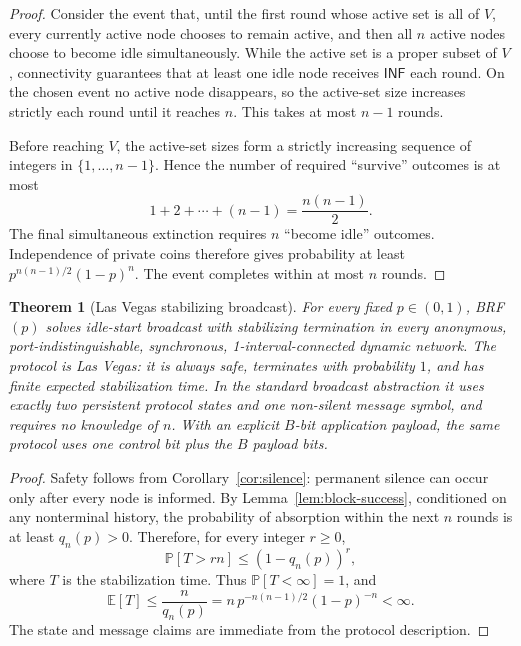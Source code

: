 \documentclass[11pt]{article}
\newtheorem{theorem}{Theorem}
\newcommand{\E}{\mathbb{E}}
\newcommand{\Prb}{\mathbb{P}}
\newcommand{\BRF}{\textsc{BRF}}
\begin{document}
\begin{proof}
Consider the event that, until the first round whose active set is all of $V$, every currently active node chooses to remain active, and then all $n$ active nodes choose to become idle simultaneously. While the active set is a proper subset of $V$, connectivity guarantees that at least one idle node receives $\mathsf{INF}$ each round. On the chosen event no active node disappears, so the active-set size increases strictly each round until it reaches $n$. This takes at most $n-1$ rounds.

Before reaching $V$, the active-set sizes form a strictly increasing sequence of integers in $\{1,\ldots,n-1\}$. Hence the number of required ``survive'' outcomes is at most
\[
  1+2+\cdots+(n-1)=\frac{n(n-1)}2.
\]
The final simultaneous extinction requires $n$ ``become idle'' outcomes. Independence of private coins therefore gives probability at least $p^{n(n-1)/2}(1-p)^n$. The event completes within at most $n$ rounds.\qedhere
\end{proof}

\begin{theorem}[Las Vegas stabilizing broadcast]\label{thm:main}
For every fixed $p\in(0,1)$, \BRF$(p)$ solves idle-start broadcast with stabilizing termination in every anonymous, port-indistinguishable, synchronous, 1-interval-connected dynamic network. The protocol is Las Vegas: it is always safe, terminates with probability $1$, and has finite expected stabilization time. In the standard broadcast abstraction it uses exactly two persistent protocol states and one non-silent message symbol, and requires no knowledge of $n$. With an explicit $B$-bit application payload, the same protocol uses one control bit plus the $B$ payload bits.
\end{theorem}

\begin{proof}
Safety follows from Corollary~\ref{cor:silence}: permanent silence can occur only after every node is informed. By Lemma~\ref{lem:block-success}, conditioned on any nonterminal history, the probability of absorption within the next $n$ rounds is at least $q_n(p)>0$. Therefore, for every integer $r\ge 0$,
\[
  \Prb[T>rn]\le (1-q_n(p))^r,
\]
where $T$ is the stabilization time. Thus $\Prb[T<\infty]=1$, and
\[
  \E[T]\le \frac{n}{q_n(p)}
  =n\,p^{-n(n-1)/2}(1-p)^{-n}<\infty.
\]
The state and message claims are immediate from the protocol description.\qedhere
\end{proof}
\end{document}
